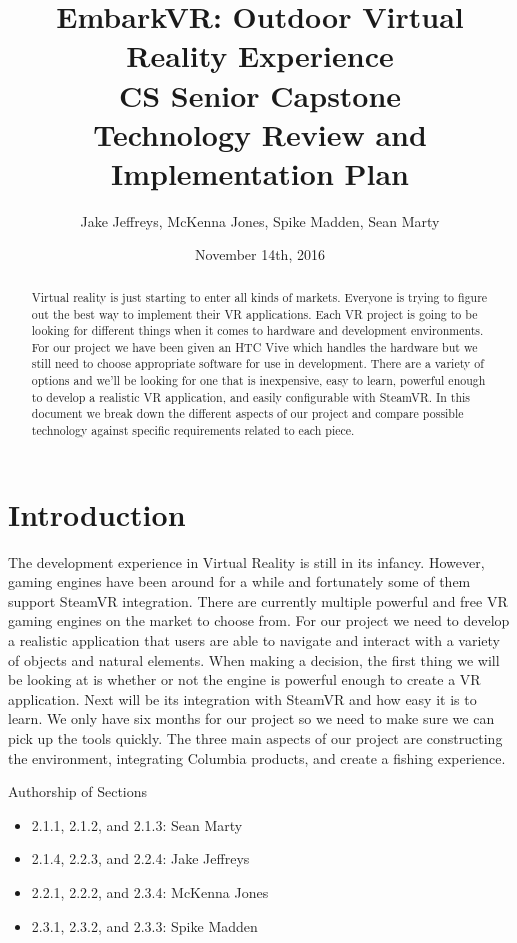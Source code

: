 \documentclass[10pt,journal,compsoc,onecolumn, draftclsnofoot]{IEEEtran}
\title{
EmbarkVR: Outdoor Virtual Reality Experience \\
CS Senior Capstone \\
Technology Review and Implementation Plan\\
\vspace{3cm}
}
\author{Jake Jeffreys, McKenna Jones, Spike Madden, Sean Marty}
\date{November 14th, 2016}
\begin{document}
\begin{titlepage}
\vspace{3cm}
\maketitle
\vspace{3cm}
\begin{abstract}
Virtual reality is just starting to enter all kinds of markets.
Everyone is trying to figure out the best way to implement their VR applications.
Each VR project is going to be looking for different things when it comes to hardware and development environments.
For our project we have been given an HTC Vive which handles the hardware but we still need to choose appropriate software for use in development.
There are a variety of options and we'll be looking for one that is inexpensive, easy to learn, powerful enough to develop a realistic VR application, and easily configurable with SteamVR.
In this document we break down the different aspects of our project and compare possible technology against specific requirements related to each piece.
\end{abstract}

\end{titlepage}

\tableofcontents
\clearpage

\section{Introduction}
The development experience in Virtual Reality is still in its infancy.
However, gaming engines have been around for a while and fortunately some of them support SteamVR integration.
There are currently multiple powerful and free VR gaming engines on the market to choose from.
For our project we need to develop a realistic application that users are able to navigate and interact with a variety of objects and natural elements.
When making a decision, the first thing we will be looking at is whether or not the engine is powerful enough to create a VR application.
Next will be its integration with SteamVR and how easy it is to learn.
We only have six months for our project so we need to make sure we can pick up the tools quickly.
The three main aspects of our project are constructing the environment, integrating Columbia products, and create a fishing experience.

Authorship of Sections
\begin{itemize}
	\item 2.1.1, 2.1.2, and 2.1.3: Sean Marty
	\item 2.1.4, 2.2.3, and 2.2.4: Jake Jeffreys
	\item 2.2.1, 2.2.2, and 2.3.4: McKenna Jones
	\item 2.3.1, 2.3.2, and 2.3.3: Spike Madden
\end{itemize}
\end{document}
